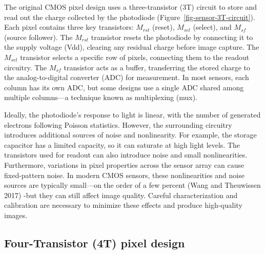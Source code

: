 \documentclass[
  letterpaper,
]{book}
\begin{document}
The original CMOS pixel design uses a three-transistor (3T) circuit to
store and read out the charge collected by the photodiode
(Figure~\ref{fig-sensor-3T-circuit}). Each pixel contains three key
transistors: \(M_{rst}\) (reset), \(M_{sel}\) (select), and \(M_{sf}\)
(source follower). The \(M_{rst}\) transistor resets the photodiode by
connecting it to the supply voltage (Vdd), clearing any residual charge
before image capture. The \(M_{sel}\) transistor selects a specific row
of pixels, connecting them to the readout circuitry. The \(M_{sf}\)
transistor acts as a buffer, transferring the stored charge to the
analog-to-digital converter (ADC) for measurement. In most sensors, each
column has its own ADC, but some designs use a single ADC shared among
multiple columns---a technique known as multiplexing (mux).

Ideally, the photodiode's response to light is linear, with the number
of generated electrons following Poisson statistics. However, the
surrounding circuitry introduces additional sources of noise and
nonlinearity. For example, the storage capacitor has a limited capacity,
so it can saturate at high light levels. The transistors used for
readout can also introduce noise and small nonlinearities. Furthermore,
variations in pixel properties across the sensor array can cause
fixed-pattern noise. In modern CMOS sensors, these nonlinearities and
noise sources are typically small---on the order of a few percent (Wang
and Theuwissen 2017) -but they can still affect image quality. Careful
characterization and calibration are necessary to minimize these effects
and produce high-quality images.

\subsection{Four-Transistor (4T) pixel
design}\label{sec-4T-pixel-design}
\end{document}
